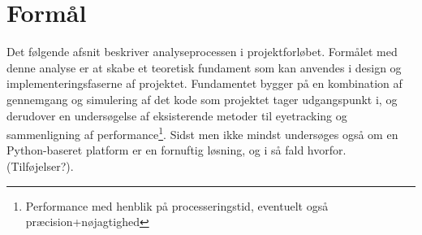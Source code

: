 \documentclass[analyse.tex]{subfiles}
\begin{document}
	
\section{Formål}
Det følgende afsnit beskriver analyseprocessen i projektforløbet. Formålet med denne analyse er at skabe et teoretisk fundament som kan anvendes i design og implementeringsfaserne af projektet. Fundamentet bygger på en kombination af gennemgang og simulering af det kode som projektet tager udgangspunkt i, og derudover en undersøgelse af eksisterende metoder til eyetracking og sammenligning af performance\footnote{Performance med henblik på processeringstid, eventuelt også præcision+nøjagtighed}. Sidst men ikke mindst undersøges også om en Python-baseret platform er en fornuftig løsning, og i så fald hvorfor. (Tilføjelser?).
\end{document}
